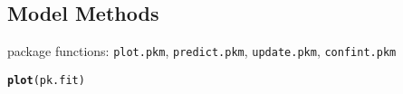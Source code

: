 \documentclass{article}\usepackage[]{graphicx}\usepackage[]{color}
\makeatletter
\newcommand{\hlstd}[1]{\textcolor[rgb]{0.345,0.345,0.345}{#1}}%
\newcommand{\hlkwd}[1]{\textcolor[rgb]{0.737,0.353,0.396}{\textbf{#1}}}%
\newenvironment{kframe}{%
 \def\at@end@of@kframe{}%
 \ifinner\ifhmode%
  \def\at@end@of@kframe{\end{minipage}}%
  \begin{minipage}{\columnwidth}%
 \fi\fi%
 \def\FrameCommand##1{\hskip\@totalleftmargin \hskip-\fboxsep
 \colorbox{shadecolor}{##1}\hskip-\fboxsep
     \hskip-\linewidth \hskip-\@totalleftmargin \hskip\columnwidth}%
 \MakeFramed {\advance\hsize-\width
   \@totalleftmargin\z@ \linewidth\hsize
   \@setminipage}}%
 {\par\unskip\endMakeFramed%
 \at@end@of@kframe}
\newenvironment{knitrout}{}{} %
\makeatother
\begin{document}
\subsection{Model Methods}
package functions: \texttt{plot.pkm}, \texttt{predict.pkm}, \texttt{update.pkm}, \texttt{confint.pkm}

\begin{knitrout}
\color{fgcolor}\begin{kframe}
\begin{alltt}
\hlkwd{plot}\hlstd{(pk.fit)}
\end{alltt}


{\ttfamily\noindent\bfseries\color{errorcolor}{\#\# Error in plot(pk.fit): object 'pk.fit' not found}}\end{kframe}
\end{knitrout}
\end{document}
